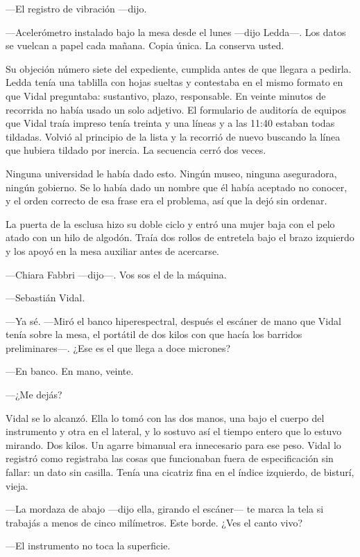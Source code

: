 ---El registro de vibración ---dijo.

---Acelerómetro instalado bajo la mesa desde el lunes ---dijo Ledda---. Los datos se vuelcan a papel cada mañana. Copia única. La conserva usted.

Su objeción número siete del expediente, cumplida antes de que llegara a pedirla. Ledda tenía una tablilla con hojas sueltas y contestaba en el mismo formato en que Vidal preguntaba: sustantivo, plazo, responsable. En veinte minutos de recorrida no había usado un solo adjetivo. El formulario de auditoría de equipos que Vidal traía impreso tenía treinta y una líneas y a las 11:40 estaban todas tildadas. Volvió al principio de la lista y la recorrió de nuevo buscando la línea que hubiera tildado por inercia. La secuencia cerró dos veces.

Ninguna universidad le había dado esto. Ningún museo, ninguna aseguradora, ningún gobierno. Se lo había dado un nombre que él había aceptado no conocer, y el orden correcto de esa frase era el problema, así que la dejó sin ordenar.

La puerta de la esclusa hizo su doble ciclo y entró una mujer baja con el pelo atado con un hilo de algodón. Traía dos rollos de entretela bajo el brazo izquierdo y los apoyó en la mesa auxiliar antes de acercarse.

---Chiara Fabbri ---dijo---. Vos sos el de la máquina.

---Sebastián Vidal.

---Ya sé. ---Miró el banco hiperespectral, después el escáner de mano que Vidal tenía sobre la mesa, el portátil de dos kilos con que hacía los barridos preliminares---. ¿Ese es el que llega a doce micrones?

---En banco. En mano, veinte.

---¿Me dejás?

Vidal se lo alcanzó. Ella lo tomó con las dos manos, una bajo el cuerpo del instrumento y otra en el lateral, y lo sostuvo así el tiempo entero que lo estuvo mirando. Dos kilos. Un agarre bimanual era innecesario para ese peso. Vidal lo registró como registraba las cosas que funcionaban fuera de especificación sin fallar: un dato sin casilla. Tenía una cicatriz fina en el índice izquierdo, de bisturí, vieja.

---La mordaza de abajo ---dijo ella, girando el escáner--- te marca la tela si trabajás a menos de cinco milímetros. Este borde. ¿Ves el canto vivo?

---El instrumento no toca la superficie.

